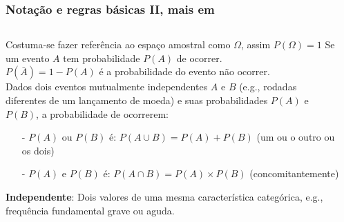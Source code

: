 \documentclass[graphics,14pt]{beamer}
\begin{document}
\begin{frame}[t,fragile=singleslide]
\frametitle{Notação e regras básicas II, mais em \citep{Halperin1965}}
	\begin{columns}[T] %
		\begin{column}{.85\textwidth}
			Costuma-se fazer referência ao espaço amostral como $\Omega$, assim $P(\Omega) = 1$			
			\vspace{0.5cm}
			Se um evento $A$ tem probabilidade $P(A)$ de ocorrer.\\
			$P(\bar{A}) = 1 - P(A)$ é a probabilidade do evento não ocorrer.\\
			\vspace{0.5cm}
			Dados dois eventos mutualmente independentes $A$ e $B$ (e.g., rodadas diferentes de um lançamento de moeda) e suas probabilidades $P(A)$ e $P(B)$, a probabilidade de ocorrerem:
			\begin{itemize}
				\item[-] $P(A)$ ou $P(B)$ é: $P(A \cup B) = P(A) + P(B)$ (um ou o outro ou os dois)
				\item[-] $P(A)$ e $P(B)$ é: $P(A \cap B) = P(A) \times P(B)$ (concomitantemente)
			\end{itemize} 
			\textbf{Independente}: Dois valores de uma mesma característica categórica, e.g., frequência fundamental grave ou aguda.\\
		\end{column}
		\hfill
		\begin{column}{0.05\textwidth}
		\end{column}		
	\end{columns}
	\vfill

	
\end{frame}
\end{document}
